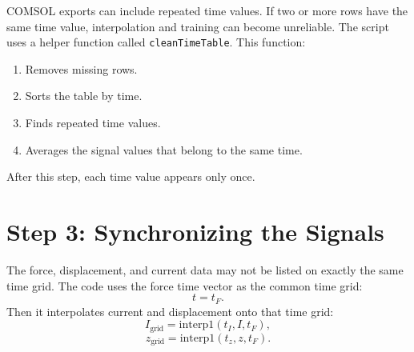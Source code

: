 \documentclass[11pt]{article}
\begin{document}
COMSOL exports can include repeated time values. If two or more rows have the same time value, interpolation and training can become unreliable. The script uses a helper function called \texttt{cleanTimeTable}. This function:
\begin{enumerate}[leftmargin=1.2cm]
    \item Removes missing rows.
    \item Sorts the table by time.
    \item Finds repeated time values.
    \item Averages the signal values that belong to the same time.
\end{enumerate}

After this step, each time value appears only once.

\section{Step 3: Synchronizing the Signals}

The force, displacement, and current data may not be listed on exactly the same time grid. The code uses the force time vector as the common time grid:
\[
    t = t_F.
\]
Then it interpolates current and displacement onto that time grid:
\begin{equation}
    I_{\mathrm{grid}} = \mathrm{interp1}(t_I, I, t_F),
\end{equation}
\begin{equation}
    z_{\mathrm{grid}} = \mathrm{interp1}(t_z, z, t_F).
\end{equation}
\end{document}
